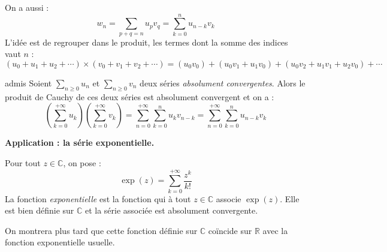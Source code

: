 \documentclass[french,11pt,twoside]{VcCours}
\newcommand{\Sum}[2]{\ensuremath{\textstyle{\sum\limits_{#1}^{#2}}}}
\begin{document}
\begin{Remarque}{} On a aussi :
$$ w_n = \sum_{p+q=n} u_p v_q =  \sum_{k=0}^n u_{n-k} v_{k}$$
L'idée est de regrouper dans le produit, les termes dont la somme des indices vaut $n$ :
$$ (u_0 + u_1 + u_2 + \cdots) \times (v_0 + v_1 + v_2 + \cdots) = (u_0 v_0) + (u_0 v_1 + u_1 v_0) + (u_0 v_2 + u _1 v_1 + u_2 v_0) + \cdots$$
\end{Remarque}

\medskip

\begin{Theoreme}{admis}
Soient $\Sum{n \geq 0}{} u_n$ et $\Sum{n \geq 0}{} v_n$ deux séries \emph{absolument convergentes}. Alors le produit de Cauchy de ces deux séries est absolument convergent et on a :
$$ \left( \sum_{k=0}^{+ \infty} u_k \right)\left( \sum_{k=0}^{+ \infty} v_k \right) =  \sum_{n=0}^{+ \infty} \sum_{k=0}^n u_k v_{n-k} = \sum_{n=0}^{+ \infty} \sum_{k=0}^n u_{n-k} v_{k}$$
\end{Theoreme}

\textbf{Application : la série exponentielle.}

\begin{TheoremeDefinition}{} Pour tout $z \in \mathbb{C}$, on pose :
$$ \exp(z) = \sum_{k=0}^{+\infty} \frac{z^k}{k!} $$
La fonction \emph{exponentielle} est la fonction qui à tout $z \in \mathbb{C}$ associe $\exp(z)$. Elle est bien définie sur $\mathbb{C}$ et la série associée est absolument convergente.
\end{TheoremeDefinition}

\begin{Demonstration}{} 

\vspace{6.5cm}
%
%
%
\end{Demonstration}

\begin{Remarque}{} On montrera plus tard que cette fonction définie sur $\mathbb{C}$ coïncide sur $\mathbb{R}$ avec la fonction exponentielle usuelle.
\end{Remarque}
\end{document}
